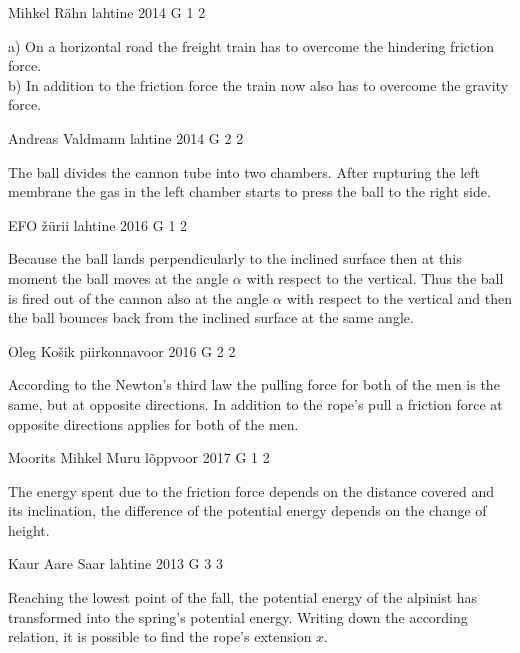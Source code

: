 \documentclass[11pt]{article}
\begin{document}
{Mihkel Rähn} %
{lahtine} %
{2014} %
{G 1} %
{2} %
{

\ifEngHint
a) On a horizontal road the freight train has to overcome the hindering friction force.\\
b) In addition to the friction force the train now also has to overcome the gravity force.
\fi
}

{Andreas Valdmann} %
{lahtine} %
{2014} %
{G 2} %
{2} %
{

\ifEngHint
The ball divides the cannon tube into two chambers. After rupturing the left membrane the gas in the left chamber starts to press the ball to the right side.
\fi
}

{EFO žürii} %
{lahtine} %
{2016} %
{G 1} %
{2} %
{

\ifEngHint
Because the ball lands perpendicularly to the inclined surface then at this moment the ball moves at the angle $\alpha$ with respect to the vertical. Thus the ball is fired out of the cannon also at the angle $\alpha$ with respect to the vertical and then the ball bounces back from the inclined surface at the same angle.
\fi
}

{Oleg Košik} %
{piirkonnavoor} %
{2016} %
{G 2} %
{2} %
{

\ifEngHint
According to the Newton’s third law the pulling force for both of the men is the same, but at opposite directions. In addition to the rope’s pull a friction force at opposite directions applies for both of the men.
\fi
}

{Moorits Mihkel Muru} %
{lõppvoor} %
{2017} %
{G 1} %
{2} %
{

\ifEngHint
The energy spent due to the friction force depends on the distance covered and its inclination, the difference of the potential energy depends on the change of height.
\fi
}

{Kaur Aare Saar} %
{lahtine} %
{2013} %
{G 3} %
{3} %
{

\ifEngHint
Reaching the lowest point of the fall, the potential energy of the alpinist has transformed into the spring’s potential energy. Writing down the according relation, it is possible to find the rope’s extension $x$.
\fi
}
\end{document}
